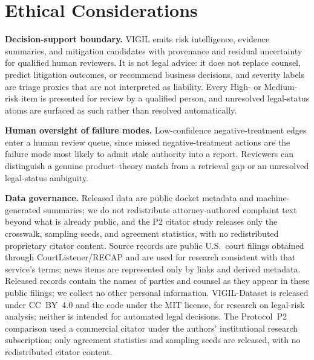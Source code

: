 \section*{Ethical Considerations}
\label{sec:ethics}

\textbf{Decision-support boundary.}
VIGIL emits risk intelligence, evidence summaries, and mitigation candidates with provenance and residual uncertainty for qualified human reviewers. It is not legal advice: it does not replace counsel, predict litigation outcomes, or recommend business decisions, and severity labels are triage proxies that are not interpreted as liability. Every High- or Medium-risk item is presented for review by a qualified person, and unresolved legal-status atoms are surfaced as such rather than resolved automatically.

\textbf{Human oversight of failure modes.}
Low-confidence negative-treatment edges enter a human review queue, since missed negative-treatment actions are the failure mode most likely to admit stale authority into a report. Reviewers can distinguish a genuine product--theory match from a retrieval gap or an unresolved legal-status ambiguity.

\textbf{Data governance.}
Released data are public docket metadata and machine-generated summaries; we do not redistribute attorney-authored complaint text beyond what is already public, and the P2 citator study releases only the crosswalk, sampling seeds, and agreement statistics, with no redistributed proprietary citator content. Source records are public U.S.\ court filings obtained through CourtListener/RECAP and are used for research consistent with that service's terms; news items are represented only by links and derived metadata. Released records contain the names of parties and counsel as they appear in these public filings; we collect no other personal information. VIGIL-Dataset is released under CC~BY~4.0 and the code under the MIT license, for research on legal-risk analysis; neither is intended for automated legal decisions. The Protocol~P2 comparison used a commercial citator under the authors' institutional research subscription; only agreement statistics and sampling seeds are released, with no redistributed citator content.

